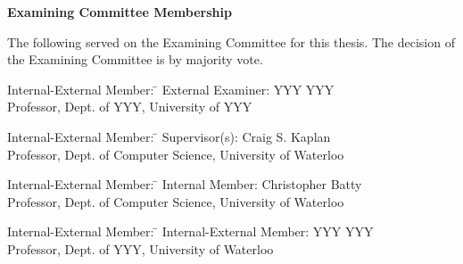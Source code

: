 \pagestyle{plain}
\setcounter{page}{2}

\cleardoublepage %

 
\begin{center}\textbf{Examining Committee Membership}\end{center}
  \noindent
The following served on the Examining Committee for this thesis. The decision of the Examining Committee is by majority vote.
  \bigskip
  
  \noindent
\begin{tabbing}
Internal-External Member: \=  \kill %
External Examiner: \>  YYY YYY \\ 
\> Professor, Dept. of YYY, University of YYY \\
\end{tabbing} 
  \bigskip
  
  \noindent
\begin{tabbing}
Internal-External Member: \=  \kill %
Supervisor(s): \> Craig S. Kaplan \\
\> Professor, Dept. of Computer Science, University of Waterloo \\
\end{tabbing}
  \bigskip
  
  \noindent
  \begin{tabbing}
Internal-External Member: \=  \kill %
Internal Member: \> Christopher Batty \\
\> Professor, Dept. of Computer Science, University of Waterloo \\
\end{tabbing}
  \bigskip
  
  \noindent
\begin{tabbing}
Internal-External Member: \=  \kill %
Internal-External Member: \> YYY YYY \\
\> Professor, Dept. of YYY, University of Waterloo \\
\end{tabbing}
  \bigskip
  
